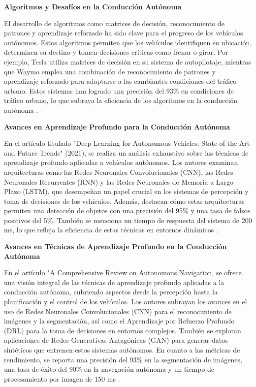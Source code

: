 \textbf{Algoritmos y Desafíos en la Conducción Autónoma}

El desarrollo de algoritmos como matrices de decisión, reconocimiento de patrones y aprendizaje reforzado ha sido clave para el progreso de los vehículos autónomos. Estos algoritmos permiten que los vehículos identifiquen su ubicación, determinen su destino y tomen decisiones críticas como frenar o girar. Por ejemplo, Tesla utiliza matrices de decisión en su sistema de autopilotaje, mientras que Waymo emplea una combinación de reconocimiento de patrones y aprendizaje reforzado para adaptarse a las cambiantes condiciones del tráfico urbano. Estos sistemas han logrado una precisión del 93\% en condiciones de tráfico urbano, lo que subraya la eficiencia de los algoritmos en la conducción autónoma \cite{digiltea2024}.

\textbf{Avances en Aprendizaje Profundo para la Conducción Autónoma}

En el artículo titulado "Deep Learning for Autonomous Vehicles: State-of-the-Art and Future Trends" (2021), se realiza un análisis exhaustivo sobre las técnicas de aprendizaje profundo aplicadas a vehículos autónomos. Los autores examinan arquitecturas como las Redes Neuronales Convolucionales (CNN), las Redes Neuronales Recurrentes (RNN) y las Redes Neuronales de Memoria a Largo Plazo (LSTM), que desempeñan un papel crucial en los sistemas de percepción y toma de decisiones de los vehículos. Además, destacan cómo estas arquitecturas permiten una detección de objetos con una precisión del 95\% y una tasa de falsos positivos del 5\%. También se menciona un tiempo de respuesta del sistema de 200 ms, lo que refleja la eficiencia de estas técnicas en entornos dinámicos \cite{silberg2021deep}.

\textbf{Avances en Técnicas de Aprendizaje Profundo en la Conducción Autónoma}

En el artículo "A Comprehensive Review on Autonomous Navigation, se ofrece una visión integral de las técnicas de aprendizaje profundo aplicadas a la conducción autónoma, cubriendo aspectos desde la percepción hasta la planificación y el control de los vehículos. Los autores subrayan los avances en el uso de Redes Neuronales Convolucionales (CNN) para el reconocimiento de imágenes y la segmentación, así como el Aprendizaje por Refuerzo Profundo (DRL) para la toma de decisiones en entornos complejos. También se exploran aplicaciones de Redes Generativas Antagónicas (GAN) para generar datos sintéticos que entrenen estos sistemas autónomos. En cuanto a las métricas de rendimiento, se reporta una precisión del 93\% en la segmentación de imágenes, una tasa de éxito del 90\% en la navegación autónoma y un tiempo de procesamiento por imagen de 150 ms \cite{nahavandi2022comprehensive}.


